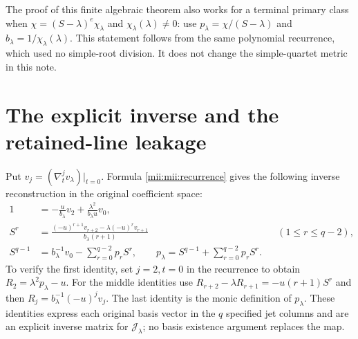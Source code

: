 \documentclass[11pt,a4paper]{article}
\begin{document}
The proof of this finite algebraic theorem also works for a
terminal primary class when
$\chi=(S-\lambda)^e\chi_\lambda$ and $\chi_\lambda(\lambda)\ne0$:
use $p_\lambda=\chi/(S-\lambda)$ and
$b_\lambda=1/\chi_\lambda(\lambda)$. This statement follows from
the same polynomial recurrence, which used no simple-root
division. It does not change the simple-quartet metric in this note.

\section{The explicit inverse and the retained-line leakage}
Put $v_j=(\nabla_t^j v_\lambda)|_{t=0}$. Formula
\eqref{mii:mii:recurrence} gives the following inverse reconstruction
in the original coefficient space:
\begin{equation}\tag{MII22}\label{mii:mii:inverse}
 \begin{aligned}
 1&=-\frac{u}{b_\lambda}v_2
            +\frac{\lambda^2}{b_\lambda u}v_0,\\
 S^r&=\frac{(-u)^{r+1}v_{r+2}
                    -\lambda(-u)^r v_{r+1}}{b_\lambda(r+1)}
                &&(1\le r\le q-2),\\
 S^{q-1}&=b_\lambda^{-1}v_0-
                         \sum_{r=0}^{q-2}p_rS^r,
 \qquad p_\lambda=S^{q-1}+\sum_{r=0}^{q-2}p_rS^r.
 \end{aligned}
\end{equation}
To verify the first identity, set $j=2,t=0$ in the recurrence to
obtain $R_2=\lambda^2p_\lambda-u$. For the middle identities use
$R_{r+2}-\lambda R_{r+1}=-u(r+1)S^r$ and then
$R_j=b_\lambda^{-1}(-u)^jv_j$. The last identity is the monic
definition of $p_\lambda$. These identities express each original
basis vector in the $q$ specified jet columns and are an explicit
inverse matrix for $\mathcal J_\lambda$; no basis existence argument
replaces the map.
\end{document}
